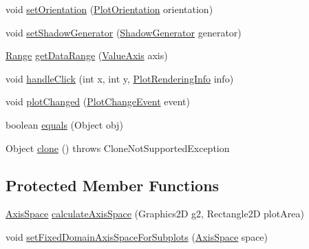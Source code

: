 \begin{DoxyCompactItemize}
\item 
void \mbox{\hyperlink{classorg_1_1jfree_1_1chart_1_1plot_1_1_combined_range_x_y_plot_a77b1cc05991daefc6091dcc4b83ba0d4}{set\+Orientation}} (\mbox{\hyperlink{classorg_1_1jfree_1_1chart_1_1plot_1_1_plot_orientation}{Plot\+Orientation}} orientation)
\item 
void \mbox{\hyperlink{classorg_1_1jfree_1_1chart_1_1plot_1_1_combined_range_x_y_plot_a7da5daf6981a6be1acf680bf1d612c3b}{set\+Shadow\+Generator}} (\mbox{\hyperlink{interfaceorg_1_1jfree_1_1chart_1_1util_1_1_shadow_generator}{Shadow\+Generator}} generator)
\item 
\mbox{\hyperlink{classorg_1_1jfree_1_1data_1_1_range}{Range}} \mbox{\hyperlink{classorg_1_1jfree_1_1chart_1_1plot_1_1_combined_range_x_y_plot_af8ecace356fe3b8cf664bf3f2a48742f}{get\+Data\+Range}} (\mbox{\hyperlink{classorg_1_1jfree_1_1chart_1_1axis_1_1_value_axis}{Value\+Axis}} axis)
\item 
void \mbox{\hyperlink{classorg_1_1jfree_1_1chart_1_1plot_1_1_combined_range_x_y_plot_a9b6b05f213757e96f574ccc8bc511a02}{handle\+Click}} (int x, int y, \mbox{\hyperlink{classorg_1_1jfree_1_1chart_1_1plot_1_1_plot_rendering_info}{Plot\+Rendering\+Info}} info)
\item 
void \mbox{\hyperlink{classorg_1_1jfree_1_1chart_1_1plot_1_1_combined_range_x_y_plot_aa99c50d65ca0d6c9c2349f856c814554}{plot\+Changed}} (\mbox{\hyperlink{classorg_1_1jfree_1_1chart_1_1event_1_1_plot_change_event}{Plot\+Change\+Event}} event)
\item 
boolean \mbox{\hyperlink{classorg_1_1jfree_1_1chart_1_1plot_1_1_combined_range_x_y_plot_a4ec6bc1749510e67ffc557e8a31c9e79}{equals}} (Object obj)
\item 
Object \mbox{\hyperlink{classorg_1_1jfree_1_1chart_1_1plot_1_1_combined_range_x_y_plot_a7b0db791d2a0d2d5f303e0a614d1cadf}{clone}} ()  throws Clone\+Not\+Supported\+Exception 
\end{DoxyCompactItemize}
\subsection*{Protected Member Functions}
\begin{DoxyCompactItemize}
\item 
\mbox{\hyperlink{classorg_1_1jfree_1_1chart_1_1axis_1_1_axis_space}{Axis\+Space}} \mbox{\hyperlink{classorg_1_1jfree_1_1chart_1_1plot_1_1_combined_range_x_y_plot_a2e035de082a4edb84b8bd80a4526d7d1}{calculate\+Axis\+Space}} (Graphics2D g2, Rectangle2D plot\+Area)
\item 
void \mbox{\hyperlink{classorg_1_1jfree_1_1chart_1_1plot_1_1_combined_range_x_y_plot_abb5e1a1c54995ef9aea152f83aceb528}{set\+Fixed\+Domain\+Axis\+Space\+For\+Subplots}} (\mbox{\hyperlink{classorg_1_1jfree_1_1chart_1_1axis_1_1_axis_space}{Axis\+Space}} space)
\end{DoxyCompactItemize}
